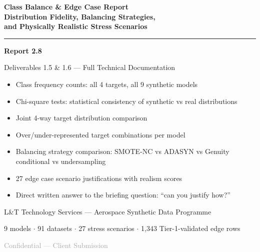 \documentclass[12pt,a4paper]{article}
\begin{document}
\begin{titlepage}
\centering
\vspace*{2cm}
{\fontsize{26}{32}\selectfont\bfseries\color{primary}
  Class Balance \& Edge Case Report\\[0.4em]
  \large\color{darkgray} Distribution Fidelity, Balancing Strategies,\\
  and Physically Realistic Stress Scenarios
}\par
\vspace{1.2cm}
\textcolor{accent}{\rule{10cm}{2pt}}\par
\vspace{0.8cm}
{\Large\bfseries Report 2.8}\par
\vspace{0.4cm}
{\large\color{darkgray} Deliverables 1.5 \& 1.6 --- Full Technical Documentation}\par
\vspace{1.8cm}
\begin{tcolorbox}[insightbox, title={Report Scope}, width=12cm]
\begin{itemize}[noitemsep]
  \item Class frequency counts: all 4 targets, all 9 synthetic models
  \item Chi-square tests: statistical consistency of synthetic vs real distributions
  \item Joint 4-way target distribution comparison
  \item Over/under-represented target combinations per model
  \item Balancing strategy comparison: SMOTE-NC vs ADASYN vs Genuity conditional vs undersampling
  \item 27 edge case scenario justifications with realism scores
  \item Direct written answer to the briefing question: ``can you justify how?''
\end{itemize}
\end{tcolorbox}
\vspace{1.8cm}
{\large L\&T Technology Services --- Aerospace Synthetic Data Programme}\par
\vspace{0.3cm}
{\normalsize\color{darkgray} 9 models $\cdot$ 91 datasets $\cdot$ 27 stress scenarios $\cdot$ 1,343 Tier-1-validated edge rows}\par
\vfill
\textcolor{darkgray}{\small Confidential --- Client Submission}
\end{titlepage}
\end{document}
